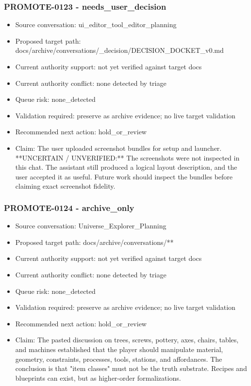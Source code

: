 \documentclass[11pt,a4paper]{report}
\begin{document}
\subsubsection{PROMOTE-0123 - needs\_user\_decision}

\begin{itemize}
\item Source conversation: ui\_editor\_tool\_editor\_planning
\item Proposed target path: docs/archive/conversations/\_decision/DECISION\_DOCKET\_v0.md
\item Current authority support: not yet verified against target docs
\item Current authority conflict: none detected by triage
\item Queue risk: none\_detected
\item Validation required: preserve as archive evidence; no live target validation
\item Recommended next action: hold\_or\_review
\item Claim: The user uploaded screenshot bundles for setup and launcher. **UNCERTAIN / UNVERIFIED:** The screenshots were not inspected in this chat. The assistant still produced a logical layout description, and the user accepted it as useful. Future work should inspect the bundles before claiming exact screenshot fidelity.
\end{itemize}

\subsubsection{PROMOTE-0124 - archive\_only}

\begin{itemize}
\item Source conversation: Universe\_Explorer\_Planning
\item Proposed target path: docs/archive/conversations/**
\item Current authority support: not yet verified against target docs
\item Current authority conflict: none detected by triage
\item Queue risk: none\_detected
\item Validation required: preserve as archive evidence; no live target validation
\item Recommended next action: hold\_or\_review
\item Claim: The pasted discussion on trees, screws, pottery, axes, chairs, tables, and machines established that the player should manipulate material, geometry, constraints, processes, tools, stations, and affordances. The conclusion is that "item classes" must not be the truth substrate. Recipes and blueprints can exist, but as higher-order formalizations.
\end{itemize}
\end{document}
